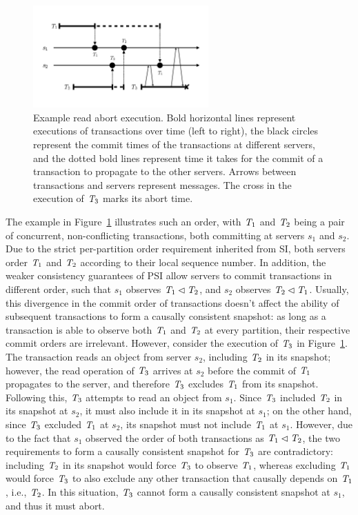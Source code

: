 \begin{figure}[t]
\centering
\includegraphics[width=0.6\textwidth]{figures/ch4_abort_execution.pdf}
\vspace{-0.5cm}
\caption{Example read abort execution. Bold horizontal lines represent executions of transactions over time (left to right), the black circles represent the commit times of the transactions at different servers, and the dotted bold lines represent time it takes for the commit of a transaction to propagate to the other servers. Arrows between transactions and servers represent messages. The cross in the execution of $\mathit{T}_3$ marks its abort time. }
\label{fig:read_abort}
\end{figure}

The example in Figure~\ref{fig:read_abort} illustrates such an order, with $\mathit{T}_1$ and $\mathit{T}_2$ being a pair of concurrent, non-conflicting transactions, both committing at servers $s_1$ and $s_2$. Due to the strict per-partition order requirement inherited from SI, both servers order $\mathit{T}_1$ and $\mathit{T}_2$ according to their local sequence number. In addition, the weaker consistency guarantees of PSI allow servers to commit transactions in different order, such that $s_1$ observes $\mathit{T}_1 \lhd \mathit{T}_2$, and $s_2$ observes $\mathit{T}_2 \lhd \mathit{T}_1$. Usually, this divergence in the commit order of transactions doesn't affect the ability of subsequent transactions to form a causally consistent snapshot: as long as a transaction is able to observe both $\mathit{T}_1$ and $\mathit{T}_2$ at every partition, their respective commit orders are irrelevant. However, consider the execution of $\mathit{T}_3$ in Figure~\ref{fig:read_abort}. The transaction reads an object from server $s_2$, including $\mathit{T}_2$ in its snapshot; however, the read operation of $\mathit{T}_3$ arrives at $s_2$ before the commit of $\mathit{T}_1$ propagates to the server, and therefore $\mathit{T}_3$ excludes $\mathit{T}_1$ from its snapshot. Following this, $\mathit{T}_3$ attempts to read an object from $s_1$. Since $\mathit{T}_3$ included $\mathit{T}_2$ in its snapshot at $s_2$, it must also include it in its snapshot at $s_1$; on the other hand, since $\mathit{T}_3$ excluded $\mathit{T}_1$ at $s_2$, its snapshot must not include $\mathit{T}_1$ at $s_1$. However, due to the fact that $s_1$ observed the order of both transactions as $\mathit{T}_1 \lhd \mathit{T}_2$, the two requirements to form a causally consistent snapshot for $\mathit{T}_3$ are contradictory: including $\mathit{T}_2$ in its snapshot would force $\mathit{T}_3$ to observe $\mathit{T}_1$, whereas excluding $\mathit{T}_1$ would force $\mathit{T}_3$ to also exclude any other transaction that causally depends on $\mathit{T}_1$, i.e., $\mathit{T}_2$. In this situation, $\mathit{T}_3$ cannot form a causally consistent snapshot at $s_1$, and thus it must abort.
